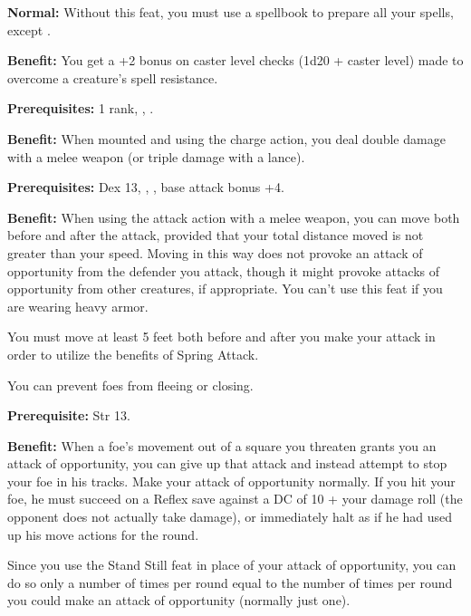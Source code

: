 \textbf{Normal:} Without this feat, you must use a spellbook to prepare all your 
spells, except .


\textbf{Benefit:} You get a +2 bonus on caster level checks (1d20 + caster level) 
made to overcome a creature's spell resistance.


\textbf{Prerequisites:}  1 rank, , .

\textbf{Benefit:} When mounted and using the charge action, you deal double damage 
with a melee weapon (or triple damage with a lance).


\textbf{Prerequisites:} Dex 13, , , base attack bonus +4.

\textbf{Benefit:} When using the attack action with a melee weapon, you can move 
both before and after the attack, provided that your total distance moved is not 
greater than your speed. Moving in this way does not provoke an attack of opportunity 
from the defender you attack, though it might provoke attacks of opportunity from 
other creatures, if appropriate. You can't use this feat if you are wearing heavy 
armor.

You must move at least 5 feet both before and after you make your attack in order 
to utilize the benefits of Spring Attack.


You can prevent foes from fleeing or closing.

\textbf{Prerequisite:} Str 13.

\textbf{Benefit:} When a foe's movement out of a square you threaten grants you 
an attack of opportunity, you can give up that attack and instead attempt to stop 
your foe in his tracks. Make your attack of opportunity normally. If you hit your 
foe, he must succeed on a Reflex save against a DC of 10 + your damage roll (the 
opponent does not actually take damage), or immediately halt as if he had used 
up his move actions for the round.

Since you use the Stand Still feat in place of your attack of opportunity, you 
can do so only a number of times per round equal to the number of times per round 
you could make an attack of opportunity (normally just one).

